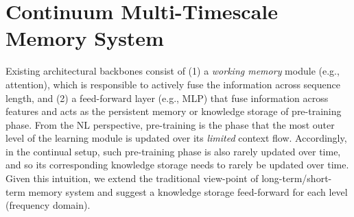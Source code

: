 \documentclass{article}
\begin{document}
{\section{Continuum Multi-Timescale Memory System}\label{sec:cmlp}  
Existing architectural backbones consist of (1) a \emph{working memory} module (e.g., attention), which is responsible to actively fuse the information across sequence length, and (2) a feed-forward layer (e.g., MLP) that fuse information across features and acts as the persistent memory or knowledge storage of pre-training phase. From the NL perspective, pre-training is the phase that the most outer level of the learning module is updated over its \emph{limited} context flow. Accordingly, in the continual setup, such pre-training phase is also rarely updated over time, and so its corresponding knowledge storage needs to rarely be updated over time. Given this intuition, we extend the traditional view-point of long-term/short-term memory system and suggest a knowledge storage feed-forward for each level (frequency domain).       

}
\end{document}

